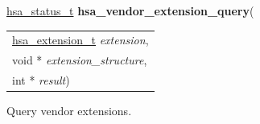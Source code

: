 \documentclass[final]{book}
\newcommand{\hsaarg}[1]{\textit{#1}}
\begin{document}
\noindent\begin{tcolorbox}[breakable,nobeforeafter,colframe=white,colback=lightgray,left=0mm]
\hyperlink{group__status_1gad755322e7ff95456520e8abdbe90d225}{hsa_status_t} \hypertarget{group__extensions_1ga87f219edc35dd68bb451a61f86fb1e18}{\textbf{hsa_vendor_extension_query}}(
\vspace{-3.5mm}\begin{longtable}{@{}p{\textwidth}}
\hspace{1.7em}\hyperlink{group__extensions_1ga6a8dade2a7681dbd98a88029b1dbb5f3}{hsa_extension_t} \hsaarg{extension},\\
\hspace{1.7em}void * \hsaarg{extension_structure},\\
\hspace{1.7em}int * \hsaarg{result})\end{longtable}

\end{tcolorbox}
Query vendor extensions.
\end{document}
